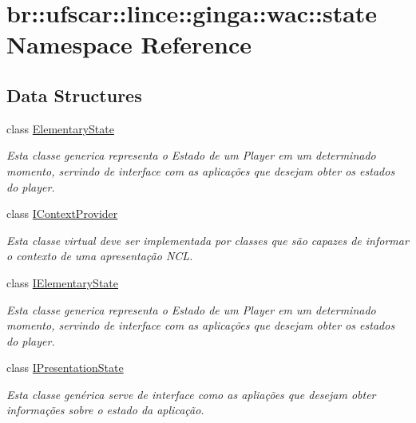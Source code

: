 \hypertarget{namespacebr_1_1ufscar_1_1lince_1_1ginga_1_1wac_1_1state}{
\section{br::ufscar::lince::ginga::wac::state Namespace Reference}
\label{namespacebr_1_1ufscar_1_1lince_1_1ginga_1_1wac_1_1state}
}
\subsection*{Data Structures}
\begin{DoxyCompactItemize}
\item 
class \hyperlink{classbr_1_1ufscar_1_1lince_1_1ginga_1_1wac_1_1state_1_1ElementaryState}{ElementaryState}
\begin{DoxyCompactList}\small\item\em Esta classe generica representa o Estado de um Player em um determinado momento, servindo de interface com as aplicações que desejam obter os estados do player. \item\end{DoxyCompactList}\item 
class \hyperlink{classbr_1_1ufscar_1_1lince_1_1ginga_1_1wac_1_1state_1_1IContextProvider}{IContextProvider}
\begin{DoxyCompactList}\small\item\em Esta classe virtual deve ser implementada por classes que são capazes de informar o contexto de uma apresentação NCL. \item\end{DoxyCompactList}\item 
class \hyperlink{classbr_1_1ufscar_1_1lince_1_1ginga_1_1wac_1_1state_1_1IElementaryState}{IElementaryState}
\begin{DoxyCompactList}\small\item\em Esta classe generica representa o Estado de um Player em um determinado momento, servindo de interface com as aplicações que desejam obter os estados do player. \item\end{DoxyCompactList}\item 
class \hyperlink{classbr_1_1ufscar_1_1lince_1_1ginga_1_1wac_1_1state_1_1IPresentationState}{IPresentationState}
\begin{DoxyCompactList}\small\item\em Esta classe genérica serve de interface como as apliações que desejam obter informações sobre o estado da aplicação. \item\end{DoxyCompactList}\item 

\end{DoxyCompactItemize}

